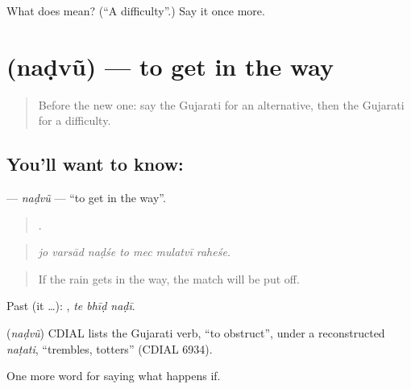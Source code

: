 \begin{tcolorbox}[breakable,colback=teal!4,colframe=teal!35!black,title={Before you move on}]
What does  mean? (\textquotedblleft{}A difficulty\textquotedblright{}.) Say it once more.
\end{tcolorbox}
\section[\texorpdfstring{\gu{નડવું} (naḍvũ)}{નડવું (naḍvũ)}]{ (naḍvũ) — to get in the way}

\label{lesson:GU-C373-nadvu}



\begin{quote}
Before the new one: say the Gujarati for an alternative, then the Gujarati for a difficulty.
\end{quote}

\subsection*{You'll want to know: }
\textbf{} — \emph{naḍvũ} — \textquotedblleft{}to get in the way\textquotedblright{}.

\begin{quote}
      .
\end{quote}

\begin{quote}
\emph{jo varsād naḍśe to mec mulatvī raheśe.}
\end{quote}

\begin{quote}
If the rain gets in the way, the match will be put off.
\end{quote}

Past (it …):   , \emph{te bhīḍ naḍī}.

\begin{cousinweb}
\textbf{} (\emph{naḍvũ}) CDIAL lists the Gujarati verb, \textquotedblleft{}to obstruct\textquotedblright{}, under a reconstructed \emph{naṭati}, \textquotedblleft{}trembles, totters\textquotedblright{} (CDIAL 6934).
\end{cousinweb}

\begin{grammarlens}[title={What you've built}]
One more word for saying what happens if.
\end{grammarlens}

